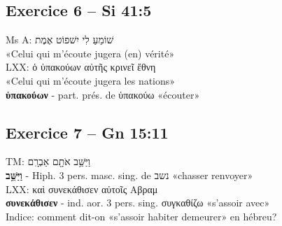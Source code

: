 \documentclass[11pt,a4paper]{article}
\begin{document}
\subsection*{Exercice 6 – Si 41:5}
Ms A: \texthebrew{שׁוֹמֵעַ לִי יִשׁפוֹט אֶמֶת} \\
«Celui qui m’écoute jugera (en) vérité» \\
LXX: \textgreek{ὁ ὑπακούων αὐτῆς κρινεῖ ἔθνη} \\
«Celui qui m’écoute jugera les nations» \\
\textbf{ὑπακούων} - part. prés. de \textgreek{ὑπακούω} «écouter»

\subsection*{Exercice 7 – Gn 15:11}
TM: \texthebrew{וַיַּשֵּׁ֥ב אֹתָ֖ם אַבְרָֽם} \\
\textbf{וַיַּשֵּׁ֥ב} - Hiph. 3 pers. masc. sing. de \texthebrew{נשב} «chasser renvoyer» \\
LXX: \textgreek{καὶ συνεκάθισεν αὐτοῖς Αβραμ} \\
\textbf{συνεκάθισεν} - ind. aor. 3 pers. sing. \textgreek{συγκαθίζω} «s’assoir avec» \\
Indice: comment dit-on «s’assoir habiter demeurer» en hébreu?
\end{document}

